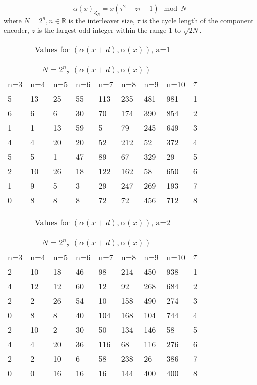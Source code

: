 \documentclass[20 pts]{article}
\begin{document}
\begin{equation}
\alpha(x)_{\mathfrak{L}_N}=x(\tau^2 - z\tau + 1) \mod N
\end{equation}
where 
$N = 2^n, n\in \mathbb{R}$ is the interleaver size, $\tau$ is the cycle length of the component encoder, $z$ is the largest odd integer within the range 1 to $\sqrt{2N}$.
\begin{table}[h!]
\centering
\begin{tabular}{ |p{0.7cm}|p{0.7cm}|p{0.7cm}|p{0.7cm}|p{0.7cm}|p{0.7cm}|p{0.7cm} |p{0.7cm}||p{0.7cm} |}
 \hline
 \multicolumn{8}{|c|}{$N=2^n$, $(\alpha(x+d),\alpha(x))$} \\
 \hline
n=3&n=4&n=5&n=6&n=7&n=8&n=9&n=10&$\tau$\\
 \hline
  5   & 13  &  25   & 55  & 113 &  235  & 481&981&1\\
  6  &   6  &   6  &  30 &   70 &  174 &  390 &854&2\\
  1 &    1 &   13&    59 &    5  &  79 &  245 &649&3\\
 4  &   4 &   20 &   20 &   52 &  212 &   52 & 372&4\\
5  &   5 &    1 &   47 &   89  &  67 &  329 & 29&5\\
 2  &  10  &  26  &  18 &  122  & 162 &   58 &650&6\\
1   &  9  &   5   &  3 &   29 &  247 &  269 &193&7\\
0   &  8   &  8  &   8  &  72  &  72 &  456  &712&8\\

 \hline
\end{tabular}
\caption{Values for $(\alpha(x+d),\alpha(x))$, a=1}
\label{table:1}
\end{table}


\begin{table}[h!]
\centering
\begin{tabular}{ |p{0.7cm}|p{0.7cm}|p{0.7cm}|p{0.7cm}|p{0.7cm}|p{0.7cm}|p{0.7cm} |p{0.7cm}||p{0.7cm} |}
 \hline
 \multicolumn{8}{|c|}{$N=2^n$, $(\alpha(x+d),\alpha(x))$} \\
 \hline
n=3&n=4&n=5&n=6&n=7&n=8&n=9&n=10&$\tau$\\
 \hline
   2  &  10 &   18 &   46  &  98 &  214 &  450&   938 &    1\\
   4   & 12  &  12  &  60  &  12  &  92 &  268 &  684  &   2\\
   2   &  2   & 26   & 54   & 10  & 158 &  490 &  274  &   3\\
   0   &  8  &   8  &  40 &  104  & 168 &  104 &  744  &   4\\
   2   & 10 &    2  &  30  &  50  & 134  & 146  &  58  &   5\\
  4    & 4   & 20  &  36  & 116  &  68 &  116  & 276  &   6\\
  2    & 2   & 10   &  6  &  58  & 238  &  26  & 386   &  7\\
  0   &  0   & 16  &  16  &  16  & 144  & 400 &  400  &   8\\

 \hline
\end{tabular}
\caption{Values for $(\alpha(x+d),\alpha(x))$, a=2}
\label{table:2}
\end{table}
\end{document}
